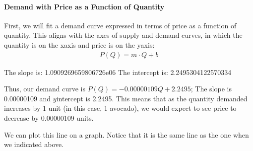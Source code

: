 \documentclass[letterpaper,10pt,english]{jupyterBook}
\begin{document}
\paragraph{Demand with Price as a Function of Quantity}
\label{\detokenize{content/01-demand/02-example:demand-with-price-as-a-function-of-quantity}}
\sphinxAtStartPar
First, we will fit a demand curve expressed in terms of price as a function of quantity. This aligns with the axes of supply and demand curves, in which the quantity is on the x\sphinxhyphen{}axis and price is on the y\sphinxhyphen{}axis:
\begin{equation*}
\begin{split}P(Q) = m\cdot Q + b\end{split}
\end{equation*}
\begin{sphinxVerbatim}[commandchars=\\\{\}]
     
 
 
\end{sphinxVerbatim}

\begin{sphinxVerbatim}[commandchars=\\\{\}]
The slope is: \PYGZhy{}1.0909269659806726e\PYGZhy{}06
The intercept is: 2.2495304122570334
\end{sphinxVerbatim}

\sphinxAtStartPar
Thus, our demand curve is \(P(Q) = -0.00000109Q+ 2.2495\); The slope is \sphinxhyphen{}0.00000109 and \(y\)\sphinxhyphen{}intercept is 2.2495. This means that as the quantity demanded increases by 1 unit (in this case, 1 avocado), we would expect to see price to decrease by 0.00000109 units.

\sphinxAtStartPar
We can plot this line on a graph. Notice that it is the same line as the one when we indicated  above.
\end{document}
